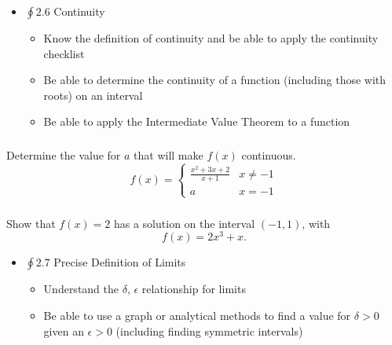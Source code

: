 \documentclass[14pt]{beamer}
\begin{document}
\begin{frame}
\begin{itemize}
\item $\oint 2.6$ Continuity 
	\begin{itemize}
	\item Know the definition of continuity and be able to apply the continuity checklist
	\item Be able to determine the continuity of a function (including those with roots) on an interval
	\item Be able to apply the Intermediate Value Theorem to a function
	\end{itemize}
\end{itemize}
\end{frame}

\begin{frame}
\frametitle{}
\begin{ex} Determine the value for $a$ that will make $f(x)$ continuous. 
\[f(x)=\begin{cases}
	\frac{x^2+3x+2}{x+1} & x\neq -1 \\
	a & x=-1
	\end{cases}\]
\end{ex}
\end{frame}

\begin{frame}
\frametitle{}
\begin{ex} Show that $f(x)=2$ has a solution on the interval $(-1,1)$, with
\[f(x)=2x^3+x.\]
\end{ex}
\end{frame}

\begin{frame}
\begin{itemize}
\item $\oint 2.7$ Precise Definition of Limits 
	\begin{itemize}
	\item Understand the $\delta$, $\epsilon$ relationship for limits
	\item Be able to use a graph or analytical methods to find a value for $\delta>0$ given an $\epsilon>0$ (including finding symmetric intervals)
	\end{itemize}
\end{itemize}
\end{frame}
\end{document}
